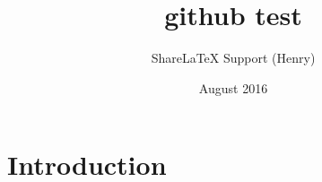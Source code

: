 \documentclass{article}
\title{github test}
\author{ShareLaTeX Support (Henry) }
\date{August 2016}
\begin{document}
\maketitle

\section{Introduction}
\end{document}
